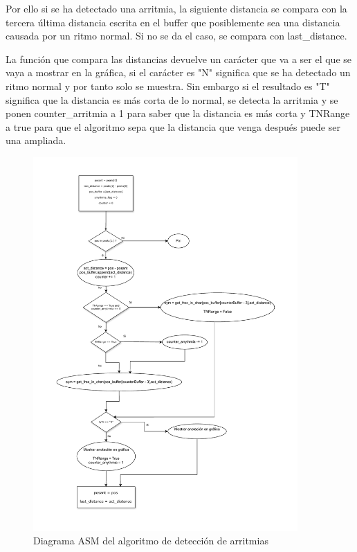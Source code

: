 Por ello si se ha detectado una arritmia, la siguiente distancia se compara con
la tercera última distancia escrita en el buffer que posiblemente sea una distancia causada por un ritmo normal. 
Si no se da el caso, se compara con last\_distance.

La función que compara las distancias devuelve un carácter que va a ser el que se vaya a mostrar en la gráfica, 
si el carácter es "N" significa que se ha detectado un ritmo normal y por tanto solo se muestra. Sin embargo si el 
resultado es "T" significa que la distancia es más corta de lo normal, se detecta la arritmia y se ponen
counter\_arritmia a 1 para saber que la distancia es más corta y TNRange a true para que el algoritmo sepa 
que la distancia que venga después puede ser una ampliada. 

\begin{figure}[h!]
	\centering
    \includegraphics[width=0.9\textwidth]{./Images/img_algoritmo/Diagramaarritmias.pdf}
    \caption{Diagrama ASM del algoritmo de detección de arritmias}
    \label{fig:diagramaarritmias}
\end{figure} 

